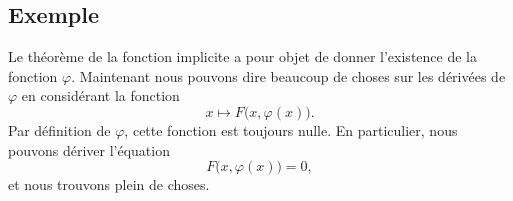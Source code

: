 \subsection{Exemple}

Le théorème de la fonction implicite a pour objet de donner l'existence de la fonction \( \varphi\). Maintenant nous pouvons dire beaucoup de choses sur les dérivées de \( \varphi\) en considérant la fonction
\begin{equation}
	x\mapsto F\big( x,\varphi(x) \big).
\end{equation}
Par définition de \( \varphi\), cette fonction est toujours nulle. En particulier, nous pouvons dériver l'équation
\begin{equation}
	F\big( x,\varphi(x) \big)=0,
\end{equation}
et nous trouvons plein de choses.

